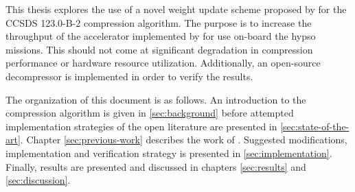 This thesis explores the use of a novel weight update scheme proposed by \citeauthor{jiaRemovalFeedbackLoop2025} for the CCSDS 123.0-B-2 compression algorithm. The purpose is to increase the throughput of the accelerator implemented by \citeauthor{vorhaugHyperspectralImageCompression2024} for use on-board the \acrshort{hypso} missions. This should not come at significant degradation in compression performance or hardware resource utilization. Additionally, an open-source decompressor is implemented in order to verify the results.

The organization of this document is as follows. An introduction to the compression algorithm is given in \autoref{sec:background} before attempted implementation strategies of the open literature are presented in \autoref{sec:state-of-the-art}. Chapter \ref{sec:previous-work} describes the work of \citeauthor{vorhaugHyperspectralImageCompression2024}. Suggested modifications, implementation and verification strategy is presented in \autoref{sec:implementation}. Finally, results are presented and discussed in chapters \ref{sec:results} and \ref{sec:discussion}.

